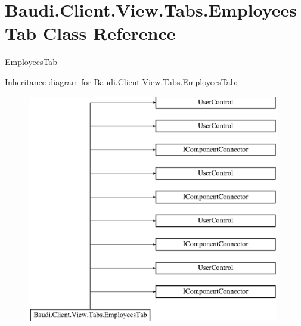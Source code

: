 \hypertarget{class_baudi_1_1_client_1_1_view_1_1_tabs_1_1_employees_tab}{}\section{Baudi.\+Client.\+View.\+Tabs.\+Employees\+Tab Class Reference}
\label{class_baudi_1_1_client_1_1_view_1_1_tabs_1_1_employees_tab}


\hyperlink{class_baudi_1_1_client_1_1_view_1_1_tabs_1_1_employees_tab}{Employees\+Tab}  


Inheritance diagram for Baudi.\+Client.\+View.\+Tabs.\+Employees\+Tab\+:\begin{figure}[H]
\begin{center}
\leavevmode
\includegraphics[height=10.000000cm]{class_baudi_1_1_client_1_1_view_1_1_tabs_1_1_employees_tab}
\end{center}
\end{figure}
